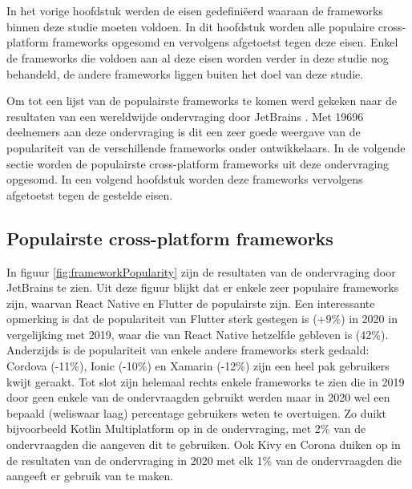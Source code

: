 \chapter{}
\label{ch:selecteren-frameworks}

In het vorige hoofdstuk werden de eisen gedefiniëerd waaraan de frameworks binnen deze studie moeten voldoen. In dit hoofdstuk worden alle populaire cross-platform frameworks opgesomd en vervolgens afgetoetst tegen deze eisen. Enkel de frameworks die voldoen aan al deze eisen worden verder in deze studie nog behandeld, de andere frameworks liggen buiten het doel van deze studie. 

Om tot een lijst van de populairste frameworks te komen werd gekeken naar de resultaten van een wereldwijde ondervraging door JetBrains \autocite{Liu2020}. Met 19696 deelnemers aan deze ondervraging is dit een zeer goede weergave van de populariteit van de verschillende frameworks onder ontwikkelaars. In de volgende sectie worden de populairste cross-platform frameworks uit deze ondervraging opgesomd. In een volgend hoofdstuk worden deze frameworks vervolgens afgetoetst tegen de gestelde eisen.

\section{Populairste cross-platform frameworks}
\label{sec:poplairsteFrameworks}

In figuur \ref{fig:frameworkPopularity} zijn de resultaten van de ondervraging door JetBrains te zien. Uit deze figuur blijkt dat er enkele zeer populaire frameworks zijn, waarvan React Native en Flutter de populairste zijn. Een interessante opmerking is dat de populariteit van Flutter sterk gestegen is (+9\%) in 2020 in vergelijking met 2019, waar die van React Native hetzelfde gebleven is (42\%). Anderzijds is de populariteit van enkele andere frameworks sterk gedaald: Cordova (-11\%), Ionic (-10\%) en Xamarin (-12\%) zijn een heel pak gebruikers kwijt geraakt. Tot slot zijn helemaal rechts enkele frameworks te zien die in 2019 door geen enkele van de ondervraagden gebruikt werden maar in 2020 wel een bepaald (weliswaar laag) percentage gebruikers weten te overtuigen. Zo duikt bijvoorbeeld Kotlin Multiplatform op in de ondervraging, met 2\% van de ondervraagden die aangeven dit te gebruiken. Ook Kivy en Corona duiken op in de resultaten van de ondervraging in 2020 met elk 1\% van de ondervraagden die aangeeft er gebruik van te maken.

